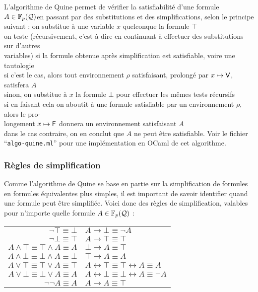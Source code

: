 			L'algorithme de Quine permet de vérifier la satisfiabilité d'une formule \(A\in\mathbb{F}_p(\mathcal{Q})\)en passant par des substitutions et des simplifications, selon le principe suivant : \nt
				 \bdot on substitue à une variable \(x\) quelconque la formule \(\top\) \\
				 \bdot on teste (récursivement, c'est-à-dire en continuant à effectuer des substitutions sur d'autres \\ \listskip variables) si la formule obtenue après simplification est satisfiable, voire une tautologie \\
				 \bdot si c'est le cas, alors tout environnement \(\rho\) satisfaisant, prolongé par \(x \mapsto \text{\sf{V}}\), satisfera \(A\) \\
				 \bdot sinon, on substitue à \(x\) la formule \(\bot\) pour effectuer les mêmes tests récursifs \\
				 \bdot si en faisant cela on aboutit à une formule satisfiable par un environnement \(\rho\), alors le pro- \\ \listskip longement \(x\mapsto \text{\sf{F}}\) donnera un environnement satisfaisant \(A\) \\
				 \bdot dans le cas contraire, on en conclut que \(A\) ne peut être satisfiable. \nll
			Voir le fichier ``\texttt{algo-quine.ml}'' pour une implémentation en OCaml de cet algorithme.
				
		\subsubsection{Règles de simplification}
			
			Comme l'algorithme de Quine se base en partie sur la simplification de formules en formules équivalentes plus simples, il est important de savoir identifier quand une formule peut être simplifiée. \nt
			Voici donc des règles de simplification, valables pour n'importe quelle formule \(A \in \mathbb{F}_p(\mathcal{Q})\) :
			\begin{center}
				\colsep{30pt}
				\begin{tabular}[h]{r|l}
					\(\neg \top \equiv \bot\) & \(A \rightarrow \bot \equiv \neg A\) \\
					\(\neg \bot \equiv \top\) & \(A \rightarrow \top \equiv \top\) \\
					\(A \wedge \top \equiv \top \wedge A \equiv A\) & \(\bot \rightarrow A \equiv \top\) \\
					\(A \wedge \bot \equiv \bot \wedge A \equiv \bot\) & \(\top \rightarrow A \equiv A\) \\
					\(A \vee \top \equiv \top \vee A \equiv \top\) & \(A \leftrightarrow \top \equiv \top \leftrightarrow A \equiv A\) \\
					\(A \vee \bot \equiv \bot \vee A \equiv A\) & \(A \leftrightarrow \bot \equiv \bot \leftrightarrow A \equiv \neg A\) \\
					\(\neg\neg A \equiv A\) & \(A \rightarrow A \equiv \top\)
				\end{tabular}
			\end{center}
			
